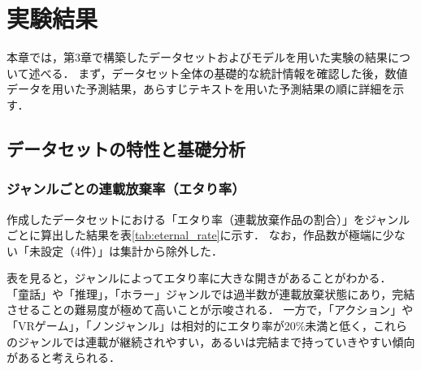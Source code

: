 \documentclass[uplatex, dvipdfmx, 11pt, a4paper, report]{jsbook}
\begin{document}


\chapter{実験結果}

本章では，第3章で構築したデータセットおよびモデルを用いた実験の結果について述べる．
まず，データセット全体の基礎的な統計情報を確認した後，数値データを用いた予測結果，あらすじテキストを用いた予測結果の順に詳細を示す．

\section{データセットの特性と基礎分析}

\subsection{ジャンルごとの連載放棄率（エタり率）}
作成したデータセットにおける「エタり率（連載放棄作品の割合）」をジャンルごとに算出した結果を表\ref{tab:eternal_rate}に示す．
なお，作品数が極端に少ない「未設定（4件）」は集計から除外した．

表を見ると，ジャンルによってエタり率に大きな開きがあることがわかる．
「童話」や「推理」，「ホラー」ジャンルでは過半数が連載放棄状態にあり，完結させることの難易度が極めて高いことが示唆される．
一方で，「アクション」や「VRゲーム」，「ノンジャンル」は相対的にエタり率が20\%未満と低く，これらのジャンルでは連載が継続されやすい，あるいは完結まで持っていきやすい傾向があると考えられる．
\end{document}
